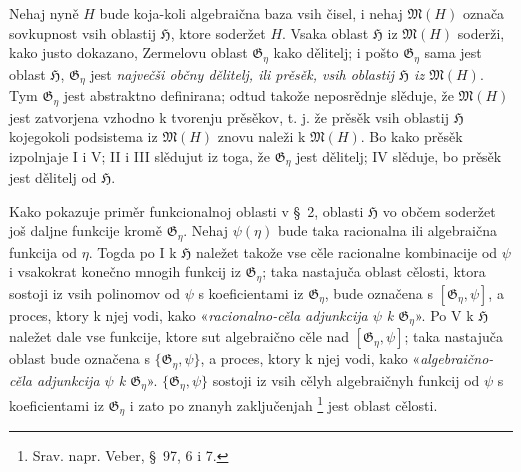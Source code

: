 \documentclass[11pt]{article}
\begin{document}
Nehaj nyně $H$ bude koja-koli algebraična baza vsih čisel, i nehaj
$\mathfrak M(H)$ označa sovkupnost vsih oblastij $\mathfrak H$, ktore soderžet
$H$. Vsaka oblast $\mathfrak H$ iz $\mathfrak M(H)$ soderži, kako justo
dokazano, Zermelovu oblast $\mathfrak G_\eta$ kako dělitelj; i pošto
$\mathfrak G_\eta$ sama jest oblast $\mathfrak H$, $\mathfrak G_\eta$ jest
{\itshape največši občny dělitelj, ili prěsěk, vsih oblastij $\mathfrak H$ iz
$\mathfrak M(H)$}. Tym $\mathfrak G_\eta$ jest abstraktno definirana; odtud
takože neposrědnje slěduje, že $\mathfrak M(H)$ jest zatvorjena vzhodno k
tvorenju prěsěkov, t. j. že prěsěk vsih oblastij $\mathfrak H$ kojegokoli
podsistema iz $\mathfrak M(H)$ znovu naleži k $\mathfrak M(H)$. Bo kako prěsěk
izpolnjaje I i V; II i III slědujut iz toga, že $\mathfrak G_\eta$ jest
dělitelj; IV slěduje, bo prěsěk jest dělitelj od $\mathfrak H$.

Kako pokazuje priměr funkcionalnoj oblasti v \S\ 2, oblasti $\mathfrak H$ vo
občem soderžet još daljne funkcije kromě $\mathfrak G_\eta$. Nehaj
$\psi(\eta)$ bude taka racionalna ili algebraična funkcija od $\eta$. Togda po
I k $\mathfrak H$ naležet takože vse cěle racionalne kombinacije od $\psi$ i
vsakokrat konečno mnogih funkcij iz $\mathfrak G_\eta$; taka nastajuča oblast
cělosti, ktora sostoji iz vsih polinomov od $\psi$ s koeficientami iz
$\mathfrak G_\eta$, bude označena s $[\mathfrak G_\eta,\psi]$, a proces, ktory
k njej vodi, kako «{\itshape racionalno-cěla adjunkcija $\psi$ k
$\mathfrak G_\eta$}». Po V k $\mathfrak H$ naležet dale vse funkcije, ktore sut
algebraično cěle nad $[\mathfrak G_\eta,\psi]$; taka nastajuča oblast bude
označena s $\{\mathfrak G_\eta,\psi\}$, a proces, ktory k njej vodi, kako
«{\itshape algebraično-cěla adjunkcija $\psi$ k $\mathfrak G_\eta$}».
$\{\mathfrak G_\eta,\psi\}$ sostoji iz vsih cělyh algebraičnyh funkcij od
$\psi$ s koeficientami iz $\mathfrak G_\eta$ i zato po znanyh zaključenjah
\footnote{Srav. napr. Veber, \S\ 97, 6 i 7.} jest oblast cělosti.
\end{document}
